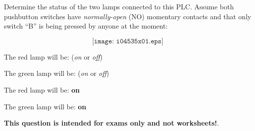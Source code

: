 

Determine the status of the two lamps connected to this PLC.  Assume both pushbutton switches have {\it normally-open} (NO) momentary contacts and that only switch ``B'' is being pressed by anyone at the moment:

$$\texttt{[image: i04535x01.eps]}$$

\vskip 10pt

The red lamp will be: ({\it on} or {\it off})

\vskip 10pt

The green lamp will be: ({\it on} or {\it off})







The red lamp will be: {\bf on}

\vskip 10pt

The green lamp will be: {\bf on}







{\bf This question is intended for exams only and not worksheets!}.


